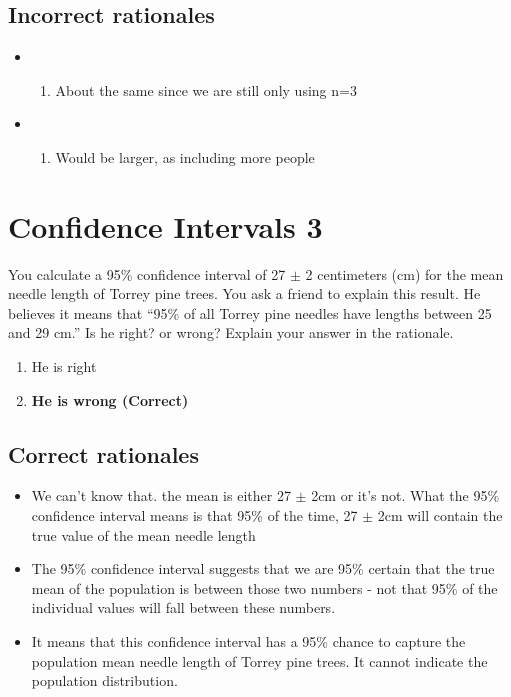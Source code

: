 \documentclass[letterpaper,12pt,twoside,printwatermark=false]{pinp}
\providecommand{\tightlist}{%
  \setlength{\itemsep}{0pt}\setlength{\parskip}{0pt}}
\begin{document}
\hypertarget{incorrect-rationales-3}{%
\subsection{Incorrect rationales}\label{incorrect-rationales-3}}

\begin{itemize}
\item
  \begin{enumerate}
  \def\labelenumi{\roman{enumi})}
  \setcounter{enumi}{1}
  \tightlist
  \item
    About the same since we are still only using n=3
  \end{enumerate}
\item
  \begin{enumerate}
  \def\labelenumi{\roman{enumi})}
  \setcounter{enumi}{1}
  \tightlist
  \item
    Would be larger, as including more people
  \end{enumerate}
\end{itemize}

\hypertarget{confidence-intervals-3}{%
\section{Confidence Intervals 3}\label{confidence-intervals-3}}

You calculate a 95\% confidence interval of 27 \(\pm\) 2 centimeters
(cm) for the mean needle length of Torrey pine trees. You ask a friend
to explain this result. He believes it means that ``95\% of all Torrey
pine needles have lengths between 25 and 29 cm.'' Is he right? or wrong?
Explain your answer in the rationale.

\begin{enumerate}
\def\labelenumi{\alph{enumi}.}
\tightlist
\item
  He is right
\item
  \textbf{He is wrong (Correct)}
\end{enumerate}

\hypertarget{correct-rationales-4}{%
\subsection{Correct rationales}\label{correct-rationales-4}}

\begin{itemize}
\tightlist
\item
  We can't know that. the mean is either 27 \(\pm\) 2cm or it's not.
  What the 95\% confidence interval means is that 95\% of the time, 27
  \(\pm\) 2cm will contain the true value of the mean needle length
\item
  The 95\% confidence interval suggests that we are 95\% certain that
  the true mean of the population is between those two numbers - not
  that 95\% of the individual values will fall between these numbers.
\item
  It means that this confidence interval has a 95\% chance to capture
  the population mean needle length of Torrey pine trees. It cannot
  indicate the population distribution.
\end{itemize}
\end{document}
